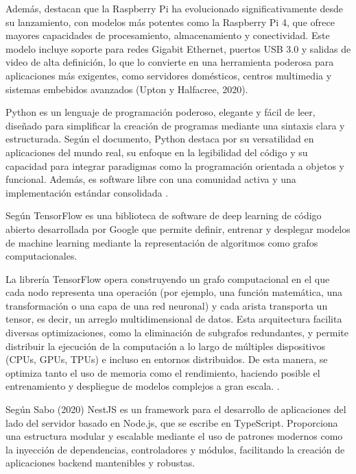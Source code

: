 Además, \citeauthor{upton_raspberry_2020} \citeyear{upton_raspberry_2020} destacan que la Raspberry Pi ha evolucionado significativamente desde su lanzamiento, con modelos más potentes como la Raspberry Pi 4, que ofrece mayores capacidades de procesamiento, almacenamiento y conectividad. Este modelo incluye soporte para redes Gigabit Ethernet, puertos USB 3.0 y salidas de video de alta definición, lo que lo convierte en una herramienta poderosa para aplicaciones más exigentes, como servidores domésticos, centros multimedia y sistemas embebidos avanzados (Upton y Halfacree, 2020).


Python es un lenguaje de programación poderoso, elegante y fácil de leer, diseñado para simplificar la creación de programas mediante una sintaxis clara y estructurada. Según el documento, Python destaca por su versatilidad en aplicaciones del mundo real, su enfoque en la legibilidad del código y su capacidad para integrar paradigmas como la programación orientada a objetos y funcional. Además, es software libre con una comunidad activa y una implementación estándar consolidada \cite{yuill_python_2006}.


Según \citeauthor{goldsborough_tour_2016} \citeyear{goldsborough_tour_2016} TensorFlow es una biblioteca de software de deep learning de código abierto desarrollada por Google que permite definir, entrenar y desplegar modelos de machine learning mediante la representación de algoritmos como grafos computacionales.

La librería TensorFlow opera construyendo un grafo computacional en el que cada nodo representa una operación (por ejemplo, una función matemática, una transformación o una capa de una red neuronal) y cada arista transporta un tensor, es decir, un arreglo multidimensional de datos. Esta arquitectura facilita diversas optimizaciones, como la eliminación de subgrafos redundantes, y permite distribuir la ejecución de la computación a lo largo de múltiples dispositivos (CPUs, GPUs, TPUs) e incluso en entornos distribuidos. De esta manera, se optimiza tanto el uso de memoria como el rendimiento, haciendo posible el entrenamiento y despliegue de modelos complejos a gran escala. \cite{goldsborough_tour_2016}.


Según \citeauthor{sabo_nestjs_2020} \citeyear{sabo_nestjs_2020} Sabo (2020) NestJS es un framework para el desarrollo de aplicaciones del lado del servidor basado en Node.js, que se escribe en TypeScript. Proporciona una estructura modular y escalable mediante el uso de patrones modernos como la inyección de dependencias, controladores y módulos, facilitando la creación de aplicaciones backend mantenibles y robustas.

